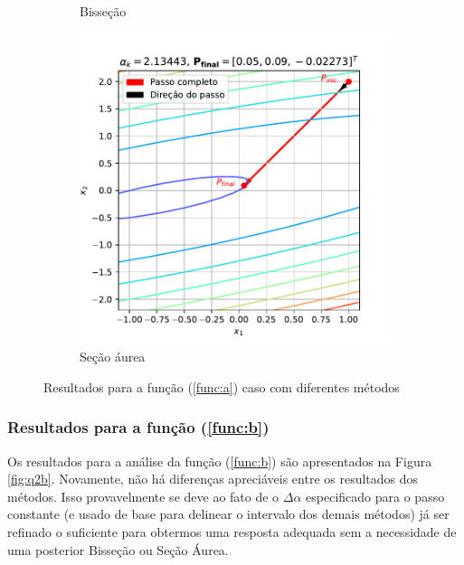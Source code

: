 \documentclass[10pt, a4paper]{article}
\begin{document}
\begin{figure}[htpb]
\begin{subfigure}[b]{0.32\textwidth}
      \caption{Bisseção}
      \label{fig:q2a_2}
  \end{subfigure}
  \hfill
  \begin{subfigure}[b]{0.32\textwidth}
      \centering
      \includegraphics[width=\textwidth]{images/q2a_3.pdf}
      \caption{Seção áurea}
      \label{fig:q2a_3}
  \end{subfigure}
  \caption{Resultados para a função (\ref{func:a}) caso com diferentes métodos}
  \label{fig:q2a}
\end{figure}

\subsubsection{Resultados para a função (\ref{func:b})}

Os resultados para a análise da função (\ref{func:b}) são apresentados na Figura \ref{fig:q2b}. Novamente, não há 
diferenças apreciáveis entre os resultados dos métodos. Isso provavelmente se deve ao fato de o $\Delta\alpha$ especificado para
o passo constante (e usado de base para delinear o intervalo dos demais métodos) já ser refinado o suficiente para 
obtermos uma resposta adequada sem a necessidade de uma posterior Bisseção ou Seção Áurea.
\end{document}
